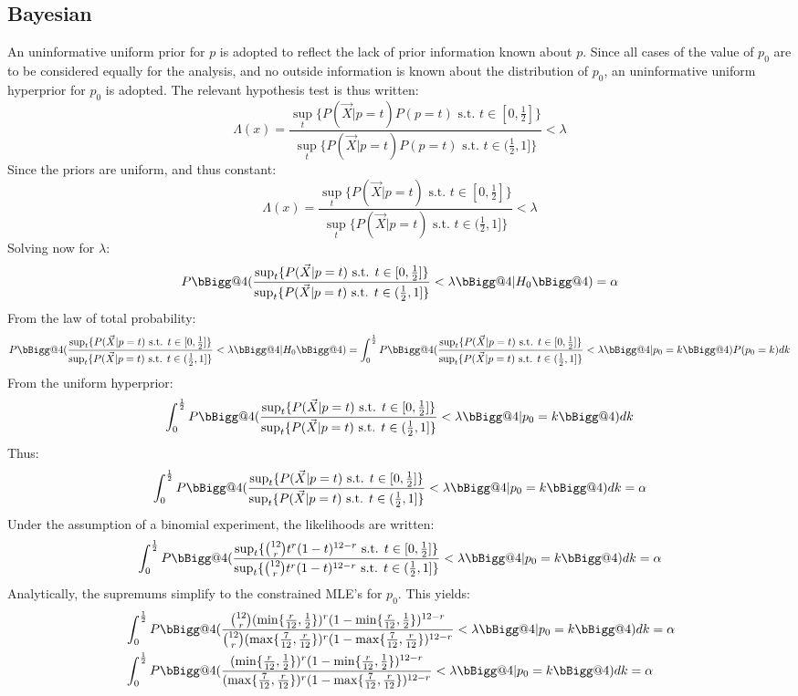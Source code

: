 \documentclass{article}
\makeatletter
\newcommand{\hella}{\bBigg@{4}}
\makeatother
\begin{document}
    \subsection*{Bayesian}
      An uninformative uniform prior for $p$ is adopted to reflect the lack of prior information known about $p$. Since all cases of the value of $p_0$ are to be considered equally for the analysis, and no outside information is known about the distribution of $p_0$, an uninformative uniform hyperprior for $p_0$ is adopted. The relevant hypothesis test is thus written:
      $$\Lambda(x) = \frac{\sup_t \{P(\vec X | p = t)P(p=t) \text{ s.t. } t \in [0, \frac{1}{2}]\}}{\sup_t \{P(\vec X | p = t)P(p=t) \text{ s.t. } t \in (\frac{1}{2}, 1]\}} < \lambda$$
      Since the priors are uniform, and thus constant:
      $$\Lambda(x) = \frac{\sup_t \{P(\vec X | p = t) \text{ s.t. } t \in [0, \frac{1}{2}]\}}{\sup_t \{P(\vec X | p = t) \text{ s.t. } t \in (\frac{1}{2}, 1]\}} < \lambda$$
      Solving now for $\lambda$:
      $$P \hella(\frac{\sup_t \{P(\vec X | p = t) \text{ s.t. } t \in [0, \frac{1}{2}]\}}{\sup_t \{P(\vec X | p = t) \text{ s.t. } t \in (\frac{1}{2}, 1]\}} < \lambda \hella | H_0 \hella) = \alpha$$
      From the law of total probability:
      $$P \hella(\frac{\sup_t \{P(\vec X | p = t) \text{ s.t. } t \in [0, \frac{1}{2}]\}}{\sup_t \{P(\vec X | p = t) \text{ s.t. } t \in (\frac{1}{2}, 1]\}} < \lambda \hella | H_0 \hella) = \int_0^{\frac{1}{2}} P \hella(\frac{\sup_t \{P(\vec X | p = t) \text{ s.t. } t \in [0, \frac{1}{2}]\}}{\sup_t \{P(\vec X | p = t) \text{ s.t. } t \in (\frac{1}{2}, 1]\}} < \lambda \hella | p_0 = k \hella)P(p_0=k) dk$$
      From the uniform hyperprior:
      $$\int_0^{\frac{1}{2}} P \hella(\frac{\sup_t \{P(\vec X | p = t) \text{ s.t. } t \in [0, \frac{1}{2}]\}}{\sup_t \{P(\vec X | p = t) \text{ s.t. } t \in (\frac{1}{2}, 1]\}} < \lambda \hella | p_0 = k \hella) dk$$
      Thus:
      $$\int_0^{\frac{1}{2}} P \hella(\frac{\sup_t \{P(\vec X | p = t) \text{ s.t. } t \in [0, \frac{1}{2}]\}}{\sup_t \{P(\vec X | p = t) \text{ s.t. } t \in (\frac{1}{2}, 1]\}} < \lambda \hella | p_0 = k \hella) dk = \alpha$$
      Under the assumption of a binomial experiment, the likelihoods are written:
      $$\int_0^{\frac{1}{2}} P \hella(\frac{\sup_t \{\binom{12}{r}t^{r}(1-t)^{12-r} \text{ s.t. } t \in [0, \frac{1}{2}]\}}{\sup_t \{\binom{12}{r}t^{r}(1-t)^{12-r} \text{ s.t. } t \in (\frac{1}{2}, 1]\}} < \lambda \hella | p_0 = k \hella) dk = \alpha$$
      Analytically, the supremums simplify to the constrained MLE's for $p_0$. This yields:
      \begin{align*}
        &\int_0^{\frac{1}{2}} P \hella(\frac{\binom{12}{r}(\min\{\frac{r}{12}, \frac{1}{2}\})^{r}(1-\min\{\frac{r}{12}, \frac{1}{2}\})^{12-r}}{\binom{12}{r}(\max\{\frac{7}{12}, \frac{r}{12}\})^{r}(1-\max\{\frac{7}{12}, \frac{r}{12}\})^{12-r}} < \lambda \hella | p_0 = k \hella) dk = \alpha\\
        &\int_0^{\frac{1}{2}} P \hella(\frac{(\min\{\frac{r}{12}, \frac{1}{2}\})^{r}(1-\min\{\frac{r}{12}, \frac{1}{2}\})^{12-r}}{(\max\{\frac{7}{12}, \frac{r}{12}\})^{r}(1-\max\{\frac{7}{12}, \frac{r}{12}\})^{12-r}} < \lambda \hella | p_0 = k \hella) dk = \alpha\\
      \end{align*}
\end{document}
